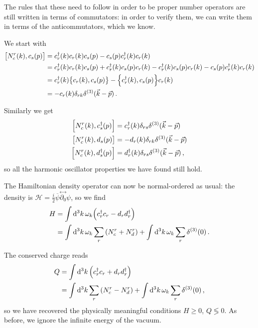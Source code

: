 \documentclass[main.tex]{subfiles}
\begin{document}
The rules that these need to follow in order to be proper number operators are still written in terms of commutators: in order to verify them, we can write them in terms of the anticommutators, which we know. 

We start with 
%
\begin{align}
\qty[N_c^{r} (k), c_s (p)] &= c_r ^\dag (k) c_r (k) c_s (p) -  c_s (p) c_r ^\dag (k) c_r (k)  \\
&= c_r ^\dag (k) c_r (k) c_s (p) + c_r ^\dag (k) c_s (p) c_r (k)
- c_r ^\dag (k) c_s (p) c_r (k) -  c_s (p) c_r ^\dag (k) c_r (k)  \\
&= c_r ^\dag (k) \qty{c_r (k), c_s (p)} - \qty{c_r ^\dag (k), c_s (p)} c_r (k)  \\
&= - c_r (k) \delta_{rk} \delta^{(3)} (\vec{k} - \vec{p})
\,.
\end{align}

Similarly we get 
%
\begin{align}
\qty[N_c^{r} (k), c_s ^\dag (p)] &= c_r ^\dag (k) \delta_{rs} \delta^{(3)} (\vec{k} - \vec{p})  \\
\qty[N_c^{r} (k), d_s (p)] &= - d_r (k) \delta_{rk} \delta^{(3)} (\vec{k} - \vec{p}) \\
\qty[N_c^{r} (k), d_s ^\dag (p)] &= d_r ^\dag (k) \delta_{rs} \delta^{(3)} (\vec{k} - \vec{p}) 
\,,
\end{align}
%
so all the harmonic oscillator properties we have found still hold. 

The Hamiltonian density operator can now be normal-ordered as usual: the density is \(\mathscr{H} = \frac{i}{2} \overline{\psi} \overset{\leftrightarrow}{\partial_0 } \psi \), so we find
%
\begin{align}
H &= \int \dd[3]{k} \omega_{k} \qty(c_r ^\dag c_r - d_r d_r ^\dag)  \\
&= \int \dd[3]{k} \omega_{k} \sum _{r} \qty(N_c^{r} + N_d^{r}) + \int \dd[3]{k} \omega_{k} \sum_{r} \delta^{(3)} (0)
\,.
\end{align}

The conserved charge reads 
%
\begin{align}
Q &= \int \dd[3]{k}  \qty(c_r ^\dag c_r + d_r d_r ^\dag)  \\
&= \int \dd[3]{k}  \sum _{r} \qty(N_c^{r} - N_d^{r}) + \int \dd[3]{k} \omega_{k} \sum_{r} \delta^{(3)} (0) 
\,,
\end{align}
%
so we have recovered the physically meaningful conditions \(H \geq 0\), \(Q \lessgtr 0\). 
As before, we ignore the infinite energy of the vacuum. 
\end{document}
